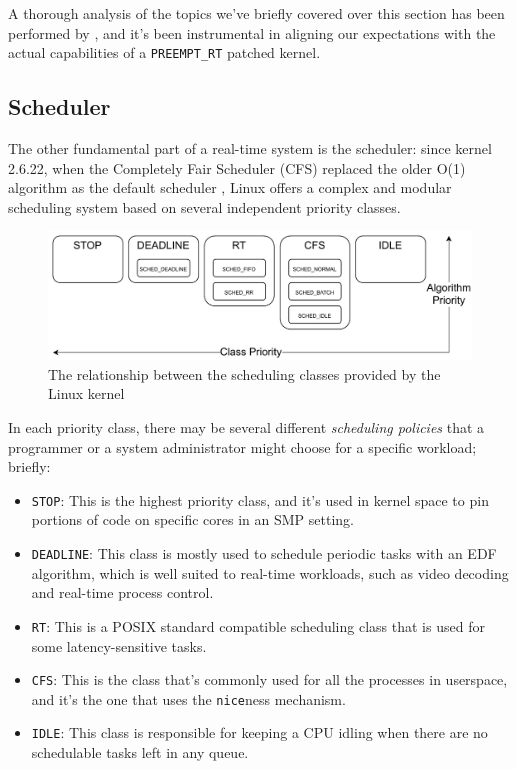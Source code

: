 \documentclass[a4paper,12pt]{report}
\begin{document}
A thorough analysis of the topics we've briefly covered over this section has been performed by \textcite{survey-preempt-rt}, and it's been instrumental in aligning our expectations with the actual capabilities of a \texttt{PREEMPT\_RT} patched kernel.

\subsection{Scheduler}

The other fundamental part of a real-time system is the scheduler: since kernel 2.6.22, when the Completely Fair Scheduler (CFS) replaced the older O(1) algorithm as the default scheduler \cite{lwn-cfs-merge}, Linux offers a complex and modular scheduling system based on several independent priority classes. 

\begin{figure}[H]
    \centering
    \includegraphics[width=\textwidth]{img/sched-class.pdf}
    \caption{The relationship between the scheduling classes provided by the Linux kernel}
\end{figure}

In each priority class, there may be several different \textit{scheduling policies} that a programmer or a system administrator might choose for a specific workload; briefly: 

\begin{itemize}
    \item \texttt{STOP}: This is the highest priority class, and it's used in kernel space to pin portions of code on specific cores in an SMP setting.
    \item \texttt{DEADLINE}: This class is mostly used to schedule periodic tasks with an EDF algorithm, which is well suited to real-time workloads, such as video decoding and real-time process control.
    \item \texttt{RT}: This is a POSIX standard compatible scheduling class that is used for some latency-sensitive tasks.
    \item \texttt{CFS}: This is the class that's commonly used for all the processes in userspace, and it's the one that uses the \texttt{nice}ness mechanism.
    \item \texttt{IDLE}: This class is responsible for keeping a CPU idling when there are no schedulable tasks left in any queue.
\end{itemize}
\end{document}
